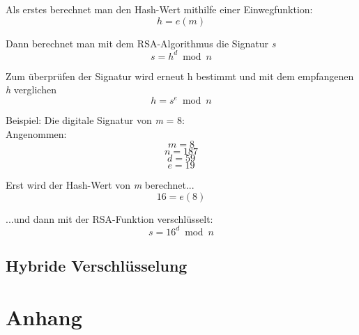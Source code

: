 \documentclass[12pt,a4paper]{scrartcl}
\begin{document}
Als erstes berechnet man den Hash-Wert mithilfe einer Einwegfunktion:
$$ {h = e(m)} $$

Dann berechnet man mit dem RSA-Algorithmus die Signatur \textit{s}
$$ {s = h^d \bmod n} $$

Zum überprüfen der Signatur wird erneut h bestimmt und mit dem empfangenen \textit{h} verglichen
$$ {h = s^e \bmod n} $$

Beispiel: Die digitale Signatur von \textit{m} = 8:\\ 

Angenommen:
$${ \textit{m} = 8 }$$
$${ \textit{n} = 187 }$$
$${ \textit{d} = 59 }$$
$${ \textit{e} = 19 }$$


Erst wird der Hash-Wert von \textit{m} berechnet...
$$ {16 = e(8)} $$	

...und dann mit der RSA-Funktion verschlüsselt: %
$$ {s = 16^d \bmod n} $$	

	 	
	\subsection{Hybride Verschlüsselung}

\pagebreak
\section{Anhang}

\listoffigures
\pagebreak

\nocite{*}
\printbibliography
\end{document}
